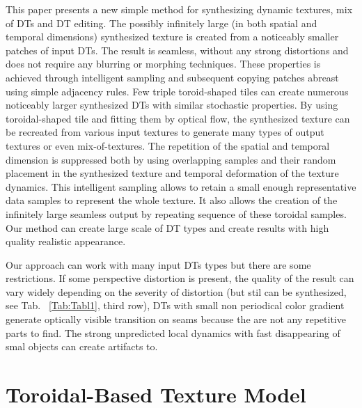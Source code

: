 \documentclass{\adsty/acmsiggraph}
\begin{document}
This paper  presents a new simple method for synthesizing dynamic textures, mix of DTs and DT editing. The possibly infinitely large (in both spatial and temporal dimensions) synthesized texture is created from a noticeably smaller patches of input DTs. The result is seamless, without any strong distortions and does not require any blurring or morphing techniques.
These properties is achieved through intelligent sampling and subsequent copying patches abreast using simple  adjacency rules.  
Few  triple toroid-shaped tiles can create numerous noticeably larger synthesized DTs with similar stochastic properties.
By using toroidal-shaped tile and fitting them by optical flow, the synthesized texture can be recreated from various input textures to generate many types of output textures or even  mix-of-textures.
 The repetition of the spatial and temporal dimension is suppressed both by using overlapping samples and their random placement in the synthesized texture and temporal deformation of the texture dynamics.
 This intelligent sampling allows to retain a small enough representative data samples to represent the whole texture. It also allows the creation of the infinitely large seamless output by repeating sequence of these
toroidal samples. Our method can create large scale of DT types and create results with high quality realistic appearance.
	
Our approach can work with many input DTs types but there are some restrictions. If some perspective distortion is present, the quality of the result can vary widely depending on the severity of distortion (but stil can be synthesized, see Tab. ~\ref{Tab:Tabl1}, third row), DTs with small non periodical color gradient generate optically visible transition on seams because the are not any repetitive parts to find. The strong unpredicted local dynamics with fast disappearing of smal objects can create artifacts to.%



\section {Toroidal-Based Texture Model}
\end{document}
